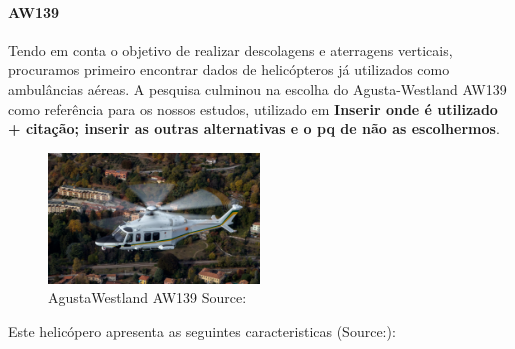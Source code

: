 \paragraph{AW139}

Tendo em conta o objetivo de realizar descolagens e aterragens verticais, procuramos primeiro encontrar dados de helicópteros já utilizados como ambulâncias aéreas. A pesquisa culminou na escolha do Agusta-Westland AW139 como referência para os nossos estudos, utilizado em \textbf{\large{Inserir onde é utilizado + citação; inserir as outras alternativas e o pq de não as escolhermos}}.\par
\FloatBarrier
\begin{figure}[h]
    \centering
    \includegraphics[width=0.5\textwidth]{Imagens/aw139.jpg}
    \caption{AgustaWestland AW139 Source:\cite{noauthor_undated-ue}}
    \label{fig:my_label}
\end{figure}
\FloatBarrier
Este helicópero apresenta as seguintes caracteristicas (Source:\cite{noauthor_undated-ue}):
